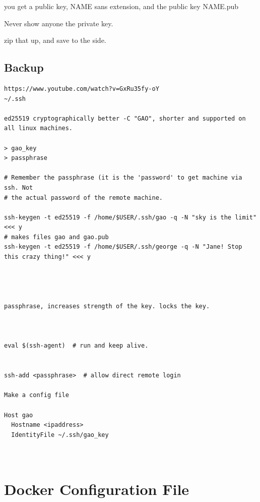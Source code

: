 \documentclass[letter,11pt,oneside]{article}
\begin{document}
you get a public key, NAME sans extension, and the public key
NAME.pub

Never show anyone the private key.



zip that up, and save to the side.



\subsection{Backup}
\begingroup \fontsize{10pt}{10pt}
\selectfont
\begin{verbatim} 
https://www.youtube.com/watch?v=GxRu35fy-oY
~/.ssh

ed25519 cryptographically better -C "GAO", shorter and supported on all linux machines.

> gao_key
> passphrase

# Remember the passphrase (it is the 'password' to get machine via ssh. Not
# the actual password of the remote machine.

ssh-keygen -t ed25519 -f /home/$USER/.ssh/gao -q -N "sky is the limit" <<< y
# makes files gao and gao.pub
ssh-keygen -t ed25519 -f /home/$USER/.ssh/george -q -N "Jane! Stop this crazy thing!" <<< y




passphrase, increases strength of the key. locks the key.



eval $(ssh-agent)  # run and keep alive.


ssh-add <passphrase>  # allow direct remote login

Make a config file

Host gao
  Hostname <ipaddress>
  IdentityFile ~/.ssh/gao_key



\end{verbatim}
\endgroup

\section{Docker Configuration File}



\begingroup \fontsize{8pt}{8pt}
\selectfont

\endgroup







\end{document}
